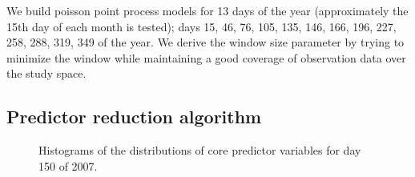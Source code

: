We build poisson point process models for 13 days of the year (approximately the 15th day of each month is tested); days 15, 46, 76, 105, 135, 146, 166, 196, 227, 258, 288, 319, 349 of the year. We derive the window size parameter by trying to minimize the window while maintaining a good coverage of observation data over the study space. 


\subsection{ Predictor reduction algorithm}

\begin{figure} [!ht]
\centerline{}
\caption{Histograms of the distributions of core predictor  variables for day 150 of 2007. }
\label{fig6}
\end{figure}



